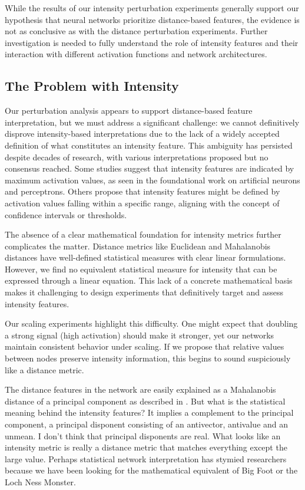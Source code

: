 While the results of our intensity perturbation experiments generally support our hypothesis that neural networks prioritize distance-based features, the evidence is not as conclusive as with the distance perturbation experiments.  Further investigation is needed to fully understand the role of intensity features and their interaction with different activation functions and network architectures.

\subsection{The Problem with Intensity}

Our perturbation analysis appears to support distance-based feature interpretation, but we must address a significant challenge: we cannot definitively disprove intensity-based interpretations due to the lack of a widely accepted definition of what constitutes an intensity feature.  This ambiguity has persisted despite decades of research, with various interpretations proposed but no consensus reached.  Some studies suggest that intensity features are indicated by maximum activation values, as seen in the foundational work on artificial neurons and perceptrons.  Others propose that intensity features might be defined by activation values falling within a specific range, aligning with the concept of confidence intervals or thresholds.

The absence of a clear mathematical foundation for intensity metrics further complicates the matter. Distance metrics like Euclidean and Mahalanobis distances have well-defined statistical measures with clear linear formulations.  However, we find no equivalent statistical measure for intensity that can be expressed through a linear equation.  This lack of a concrete mathematical basis makes it challenging to design experiments that definitively target and assess intensity features.

Our scaling experiments highlight this difficulty. One might expect that doubling a strong signal (high activation) should make it stronger, yet our networks maintain consistent behavior under scaling.  If we propose that relative values between nodes preserve intensity information, this begins to sound suspiciously like a distance metric.

The distance features in the network are easily explained as a Mahalanobis distance of a principal component as described in \cite{oursland2024interpreting}. But what is the statistical meaning behind the intensity features? It implies a complement to the principal component, a principal disponent consisting of an antivector, antivalue and an unmean. I don't think that principal disponents are real. What looks like an intensity metric is really a distance metric that matches everything except the large value. Perhaps statistical network interpretation has stymied researchers because we have been looking for the mathematical equivalent of Big Foot or the Loch Ness Monster.